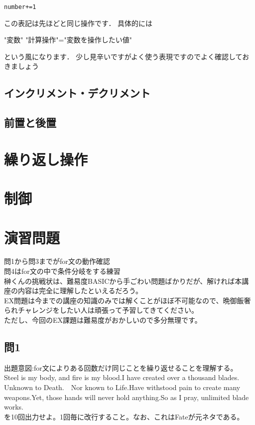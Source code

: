 \documentclass[a4j,titlepage,dvipdfmx]{jsarticle}   %
\begin{document}
\begin{lstlisting}
number+=1
\end{lstlisting}
この表記は先ほどと同じ操作です．
具体的には
\begin{itembox}
"変数" "計算操作"="変数を操作したい値"
\begin{itembox}
という風になります．
少し見辛いですがよく使う表現ですのでよく確認しておきましょう

\subsection{インクリメント・デクリメント}
\subsection{前置と後置}
\section{繰り返し操作}
\section{制御}
\section{演習問題}
問1から問3までがfor文の動作確認\\
問4はfor文の中で条件分岐をする練習\\
榊くんの挑戦状は、難易度BASICから手ごわい問題ばかりだが、解ければ本講座の内容は完全に理解したといえるだろう。\\
EX問題は今までの講座の知識のみでは解くことがほぼ不可能なので、晩御飯奢られチャレンジをしたい人は頑張って予習してきてください。\\
ただし、今回のEX課題は難易度がおかしいので多分無理です。\\

\subsection{問1}
出題意図:for文によりある回数だけ同じことを繰り返せることを理解する。\\

Steel is my body, and fire is my blood.I have created over a thousand blades.　Unknown to Death.　Nor known to Life.Have withstood pain to create many weapons.Yet, those hands will never hold anything.So as I pray, unlimited blade works.\\
を10回出力せよ。1回毎に改行すること。なお、これはFateが元ネタである。\\


\end{itembox}
\end{itembox}
\end{document}
